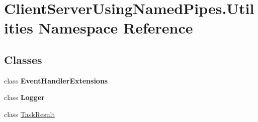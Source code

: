 \hypertarget{namespace_client_server_using_named_pipes_1_1_utilities}{}\section{Client\+Server\+Using\+Named\+Pipes.\+Utilities Namespace Reference}
\label{namespace_client_server_using_named_pipes_1_1_utilities}
\subsection*{Classes}
\begin{DoxyCompactItemize}
\item 
class {\bfseries Event\+Handler\+Extensions}
\item 
class {\bfseries Logger}
\item 
class \hyperlink{class_client_server_using_named_pipes_1_1_utilities_1_1_task_result}{Task\+Result}
\end{DoxyCompactItemize}
